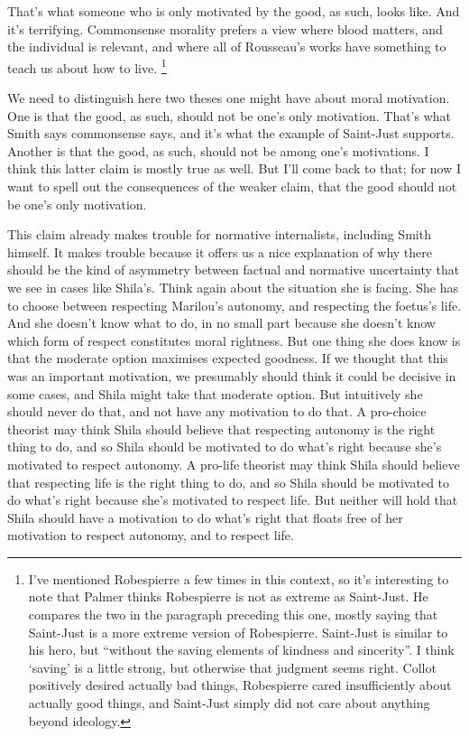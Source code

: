 \documentclass[
  10pt,
  letterpaper,
  twoside]{scrbook}
\begin{document}
That's what someone who is only motivated by the good, as such, looks
like. And it's terrifying. Commonsense morality prefers a view where
blood matters, and the individual is relevant, and where all of
Rousseau's works have something to teach us about how to live.
\footnote{I've mentioned {Robespierre} a few times in this context, so
  it's interesting to note that Palmer thinks {Robespierre} is not as
  extreme as {Saint-Just}. He compares the two in the paragraph
  preceding this one, mostly saying that {Saint-Just} is a more extreme
  version of {Robespierre}. {Saint-Just} is similar to his hero, but
  ``without the saving elements of kindness and sincerity''. I think
  `saving' is a little strong, but otherwise that judgment seems right.
  Collot positively desired actually bad things, {Robespierre} cared
  insufficiently about actually good things, and {Saint-Just} simply did
  not care about anything beyond ideology.}

We need to distinguish here two theses one might have about moral
motivation. One is that the good, as such, should not be one's only
motivation. That's what Smith says commonsense says, and it's what the
example of {Saint-Just} supports. Another is that the good, as such,
should not be among one's motivations. I think this latter claim is
mostly true as well. But I'll come back to that; for now I want to spell
out the consequences of the weaker claim, that the good should not be
one's only motivation.

This claim already makes trouble for normative internalists, including
Smith himself. It makes trouble because it offers us a nice explanation
of why there should be the kind of asymmetry between factual and
normative uncertainty that we see in cases like {Shila}'s. Think again
about the situation she is facing. She has to choose between respecting
{Marilou}'s autonomy, and respecting the foetus's life. And she doesn't
know what to do, in no small part because she doesn't know which form of
respect constitutes moral rightness. But one thing she does know is that
the moderate option maximises expected goodness. If we thought that this
was an important motivation, we presumably should think it could be
decisive in some cases, and {Shila} might take that moderate option. But
intuitively she should never do that, and not have any motivation to do
that. A pro-choice theorist may think {Shila} should believe that
respecting autonomy is the right thing to do, and so {Shila} should be
motivated to do what's right because she's motivated to respect
autonomy. A pro-life theorist may think {Shila} should believe that
respecting life is the right thing to do, and so {Shila} should be
motivated to do what's right because she's motivated to respect life.
But neither will hold that {Shila} should have a motivation to do what's
right that floats free of her motivation to respect autonomy, and to
respect life.
\end{document}
